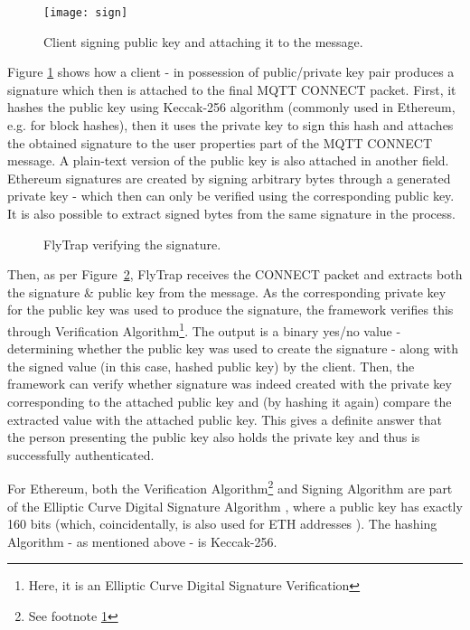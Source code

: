 \begin{figure}[h]
    \centering
    \texttt{[image: sign]}
    \caption{Client signing public key and attaching it to the message.}
    \label{fig:sign}
\end{figure}

Figure \ref{fig:sign} shows how a client - in possession of public/private key pair produces a signature which then is attached to the final MQTT CONNECT packet. First, it hashes the public key using Keccak-256 algorithm \cite{bertoni2009keccak} (commonly used in Ethereum, e.g. for block hashes), then it uses the private key to sign this hash and attaches the obtained signature to the user properties part of the MQTT CONNECT message. A plain-text version of the public key is also attached in another field. Ethereum signatures are created by signing arbitrary bytes through a generated private key - which then can only be verified using the corresponding public key. It is also possible to extract signed bytes from the same signature in the process.

\begin{figure}[h]
    \centering
    \caption{FlyTrap verifying the signature.}
    \label{fig:verify}
\end{figure}

Then, as per Figure~\ref{fig:verify}, FlyTrap receives the CONNECT packet and extracts both the signature \& public key from the message. As the corresponding private key for the public key was used to produce the signature, the framework verifies this through Verification Algorithm\footnote{\label{fot1}Here, it is an Elliptic Curve Digital Signature Verification}. The output is a binary yes/no value - determining whether the public key was used to create the signature - along with the signed value (in this case, hashed public key) by the client. Then, the framework can verify whether signature was indeed created with the private key corresponding to the attached public key and (by hashing it again) compare the extracted value with the attached public key. This gives a definite answer that the person presenting the public key also holds the private key and thus is successfully authenticated.

For Ethereum, both the Verification Algorithm\footnote{See footnote \ref{fot1}} and Signing Algorithm are part of the Elliptic Curve Digital Signature Algorithm \citep{johnson2001elliptic}, where a public key has exactly 160 bits (which, coincidentally, is also used for ETH addresses \cite{dameron2017beigepaper}). The hashing Algorithm - as mentioned above - is Keccak-256.

